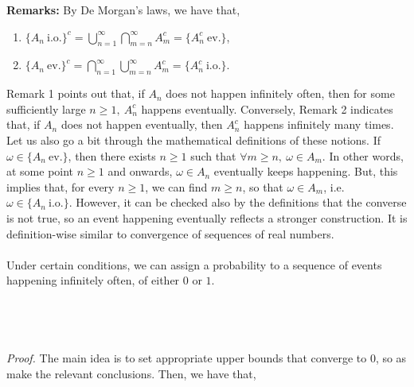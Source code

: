 \documentclass{article}
\begin{document}
\textbf{Remarks:} By De Morgan's laws, we have that,
\begin{enumerate}
	\item $\{A_n \ \text{i.o.}\}^c = \bigcup_{n=1}^{\infty}\bigcap_{m=n}^{\infty}A_m^c = \{A_n^c \ \text{ev.}\}$,
	\item $\{A_n \ \text{ev.}\}^c = \bigcap_{n=1}^{\infty}\bigcup_{m=n}^{\infty}A_m^c = \{A_n^c \ \text{i.o.}\}$.
\end{enumerate}
Remark 1 points out that, if $A_n$ does not happen infinitely often, then for some sufficiently large $n\geq1, \ A_n^c$ happens eventually. Conversely, Remark 2 indicates that, if $A_n$ does not happen eventually, then $A_n^c$ happens infinitely many times. Let us also go a bit through the mathematical definitions of these notions. If $\omega \in \{A_n \ \text{ev.}\}$, then there exists $n \geq 1$ such that $\forall m \geq n, \ \omega \in A_m$. In other words, at some point $n \geq 1$ and onwards, $\omega \in A_n$ eventually keeps happening. But, this implies that, for every $n \geq 1$, we can find $m \geq n$, so that $\omega \in A_m$, i.e. $\omega \in \{A_n \ \text{i.o.}\}$. However, it can be checked also by the definitions that the converse is not true, so an event happening eventually reflects a stronger construction. It is definition-wise similar to convergence of sequences of real numbers.\\\\
Under certain conditions, we can assign a probability to a sequence of events happening infinitely often, of either $0$ or $1$.\\\\
\noindent{}\\\\\\
\textit{Proof.} The main idea is to set appropriate upper bounds that converge to $0$, so as make the relevant conclusions. Then, we have that,
\end{document}
